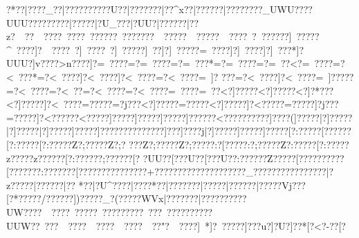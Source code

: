 {{{{{{{{{{{{{{{{{{{{{{{{{{{{{{{{{{{{{{{{{{{{{{{{{{{{{{{{{{{{{{{{{{{{{{{{{{{{{{{{{{{{{{{{{{{{{{{{{{{{{{{{{{{{{{{{{{{{{{{{{{{{{{{{{{{{{{{{{{{{{{{{{{{{{{{{{{{{{{{{{{{{{{{{{{{{{{{{{{{{{{{{{{{{{{{{{{{{{{{{{{{{{{{{{{{{{{{{{{{{{{{{{{{{{{{{{{{{{{{{{{{{{{{{{{{{{{{{{{{{{{{{{{{{{{{{{{{{{{{{{{{{{{{{{{{{{{{{{{{{{{{{{{{{{{{{{{{{{{{{{{{{{{{{{{{{{{{{{{{{{{{{{{{{{{{{{{{{{{{{{{{{{{{{{{{{{{{{{{{{{{{{{{{{{{{{{{{{{{{{{{{{{{{{{{{{{{{{{{{{{{{{{{{{{{{{{{{{{{{{{{{{{{{{{{{{{{{{{{{{{{{{{{{{{{{{{{{{{{{{{{{{{{{{{{{{{{{{{{{{{{{{{{{{{{{{{{{{{{{{{{{{{{{{{{{{{{{{{{{{{{{{{{{{{{{{{{{{{{{{{{{{{{{{{{{{{{{{{{{{{{{{{{{{{{{{{{{{{{{{{{{{{{{{{{{{{{{{{{{{{{{{{{{{{{{{{{{{{{{{{{{{{{{{{{{{{{{{{{{{{{{{{{{{{{{{{{{{{{{{{{{{{{{{{{{{{{{{{{{{{{{{{{{{{{{{{{{{{{{{{{{{{{{{{{{{{{{{{{{{{{{{{{{{{{{{{{{{{{{{{{{{{{{{{{{{{{{{{{{{{{{{{{{{{{{{{{{{{{{{{{{{{{{{{{{{{{{{{{{{{{{{{{{{{{{{{{{{{{{{{{{{{{{{{{{{{{{{{{{{{{{{{{{{{{{{{{{{{{{{{{{{{{{{{{{{{{{{{{{{{{{{{{{{{{{{{{{{{{{{{{{{{{{{{{{{{{{{{{{{{{{{{{{{{{{{{{{{{{{{{{{{{{{{{{{{{{{{{{{{{{{{{{{{{{{{{{{{{{{{{{{{{{{{{{{{{{{{{{{{{{{{{{{{{{{{{{{{{{{{{?*??|????_??|??????{????U??|???????|??^x?{?|?????{?|???????{?_UWU??{??UUU??{???????|????{?|?U_??{?|?UU?|?}?????|?}?z?~~??~~????~????~?}?????~?}?????}?~~????}?~~????}?~~????~?}~??????]~????}?^~????]?~~????~?]~????~?]~????}?]~??]?]~????}?=~????]?]~????]?]~???*\?]?UUU?\?]v????\?>n????]?=~????=?=~????=?=~???*=?=~????=?=~??<?=~????=?<~???*=?<~????]?<~????]?<~????=?<~????=~]?
???=?<~????]?<~????=~]?????=?<~????=?<~??=?<~????=?<~????\?=~????\?=~??<?]?????<?]?????<?]?*???<?]?????]?<~????\?=?????=?\?j???<?]?????\?=?????<?]?????]?<?????\?=?????\?]?j???\?=?????]?<?????}?<?????]?\?????]?\?????]?\?????\?]?????}?<?????\?}?????\?]????(\?]?????|?]?????|?]?????|?]?????\?]?????\?]?????\?}????\?}?????\?]???]?\????j|?]?????\?]?????\?]?????[?:?????[??????[?:?????[?:?????Z?;?????Z?;?
???Z?;?????Z?;?????:?[?????:?;?????Z?:?????[?:?????z?????z??????[?:?????{?;??????[?
?UU??[? ??U??[? ??U??:? ?????Z? ????[????{??  ????[???????:???????[???????{???????{?+??}??{???????{??????{???_??????????{???? ??|?z?????|?????{?|??
*?{?|?U^????|????*??|???????|????{?|?????{?|???{?{?Vj??{?[? *???{??/??????])?????_? (?????WVx|???????|??????????UW????~~????~?????~?????????~???~?????????}?UUW?}?}~??  }?~~??? }?~~??? }?~~???}?~~??" }?~~???}?]~*   ]?}~????}?]???u?\?]?U?\?]??*[?<?-?{?[?
}}}}}}}}}}}}}}}}}}}}}}}}}}}}}}}}}}}}}}}}}}}}}}}}}}}}}}}}}}}}}}}}}}}}}}}}}}}}}}}}}}}}}}}}}}}}}}}}}}}}}}}}}}}}}}}}}}}}}}}}}}}}}}}}}}}}}}}}}}}}}}}}}}}}}}}}}}}}}}}}}}}}}}}}}}}}}}}}}}}}}}}}}}}}}}}}}}}}}}}}}}}}}}}}}}}}}}}}}}}}}}}}}}}}}}}}}}}}}}}}}}}}}}}}}}}}}}}}}}}}}}}}}}}}}}}}}}}}}}}}}}}}}}}}}}}}}}}}}}}}}}}}}}}}}}}}}}}}}}}}}}}}}}}}}}}}}}}}}}}}}}}}}}}}}}}}}}}}}}}}}}}}}}}}}}}}}}}}}}}}}}}}}}}}}}}}}}}}}}}}}}}}}}}}}}}}}}}}}}}}}}}}}}}}}}}}}}}}}}}}}}}}}}}}}}}}}}}}}}}}}}}}}}}}}}}}}}}}}}}}}}}}}}}}}}}}}}}}}}}}}}}}}}}}}}}}}}}}}}}}}}}}}}}}}}}}}}}}}}}}}}}}}}}}}}}}}}}}}}}}}}}}}}}}}}}}}}}}}}}}}}}}}}}}}}}}}}}}}}}}}}}}}}}}}}}}}}}}}}}}}}}}}}}}}}}}}}}}}}}}}}}}}}}}}}}}}}}}}}}}}}}}}}}}}}}}}}}}}}}}}}}}}}}}}}}}}}}}}}}}}}}}}}}}}}}}}}}}}}}}}}}}}}}}}}}}}}}}}}}}}}}}}}}}}}}}}}}}}}}}}}}}}}}}}}}}}}}}}}}}}}}}}}}}}}}}}}}}}}}}}}}}}}}}}}}}}}}}}}}}}}}}}}}}}}}}}}}}}}}}}}}}}}}}}}}}}}}}}}}}}}}}}}}}}}}}}}}}}}}}}}}}}}}}}}}}}}}}}}}}}}}}}}}}}}}}}}}}}}}}}}}}}}}}}}}}}}}}}}}}}}}}}}}}}}}}}}}}}}}}}}}}}}}}}}}}}}}}}}}}}}}}}}}}}}}}}}}}}}}}}}}}}}}}}}}}}}}}}}}}}}}}}}}}}}}}}}}}}}
